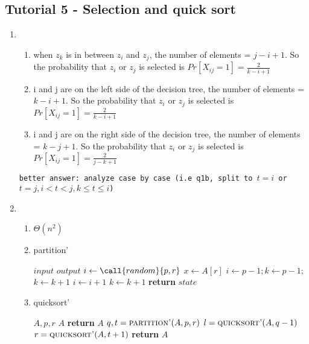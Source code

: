 \documentclass[../../main/main.tex]{subfiles}
\begin{document}
\subsection{Tutorial 5 - Selection and quick sort} 
\begin{enumerate}
  \item \begin{enumerate}
    \item when $z_k$ is in between  $z_i$ and $z_j$,  the number of elements =  $j-i+1$. So the probability that $z_i$ or  $z_j$ is selected is $Pr[X_{ij} = 1]= \frac{2}{k-i+1} $
  \item i and j are on the left side of the decision tree, the number of elements =  $k-i+1$. So the probability that $z_i$ or  $z_j$ is selected is $Pr[X_{ij} = 1]= \frac{2}{k-i+1} $
    \item i and j are on the right side of the decision tree, the number of elements =  $k-j+1$. So the probability that $z_i$ or  $z_j$ is selected is $Pr[X_{ij} = 1]= \frac{2}{j-k+1} $
  \end{enumerate}
  \texttt{better answer: analyze case by case (i.e q1b, split to $t= i$ or $t= j, i < t<j, k\le t\le i$)}
\item %
  \begin{enumerate}
    \item  $\Theta(n^2)$
  \item \begin{algorithm}[H]
  \algrenewcommand{}
  \algrenewcommand{}
  \caption{partition'}\label{alg:}
  \begin{algorithmic}[1]
    \Require $input$
    \Ensure $output$
    \State $i \gets \call{random}{p,r}$
    \State $x \gets A[r]$
    \State $i \gets p-1; k \gets p-1;$
    \State $k \gets k+1$
    \State {}
    \State $i \gets i+1$
    \State $k \gets k+1$
    \State {}
    \State {}
    \EndIf
    \State {}
    \State \textbf{return} $state$
  \end{algorithmic}
\end{algorithm}
\item %
\begin{algorithm}
  \algrenewcommand{}
  \algrenewcommand{}
  \caption{quicksort'}\label{alg:}
  \begin{algorithmic}[1]
    \Require $A,p,r$
    \Ensure $A$
    \State \textbf{return} $A$
    \EndIf
    \State $q,t = \Call{partition'}{A,p,r}$
    \State $l = \Call{quicksort'}{A,q-1}$
    \State $r = \Call{quicksort'}{A,t+1}$
    \State \textbf{return} $A$
  \end{algorithmic}
\end{algorithm}


\end{enumerate}
\end{enumerate}
\end{document}
